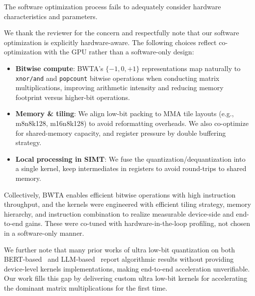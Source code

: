 \begin{revcomment}
The software optimization process fails to adequately consider hardware characteristics and parameters. 

\end{revcomment}
\begin{revresponse}[]

We thank the reviewer for the concern and respectfully note that our software optimization is explicitly hardware-aware. The following choices reflect co-optimization with the GPU rather than a software-only design: 
\begin{itemize}
    \item \textbf{Bitwise compute}: BWTA's $\{-1,0,+1\}$ representations map naturally to \texttt{xnor/and} and \texttt{popcount} bitwise operations when conducting matrix multiplications, improving arithmetic intensity and reducing memory footprint versus higher-bit operations. 
    \item \textbf{Memory \& tiling}: We align low-bit packing to MMA tile layouts (e.g., m8n8k128, m16n8k128) to avoid reformatting overheads. We also co-optimize for shared-memory capacity, and register pressure by double buffering strategy. 
    \item \textbf{Local processing in SIMT}: We fuse the quantization/dequantization into a single kernel, keep intermediates in registers to avoid round-trips to shared memory. 
\end{itemize}
Collectively, BWTA enables efficient bitwise operations with high instruction throughput, and the kernels were engineered with efficient tiling strategy, memory hierarchy, and instruction combination to realize measurable device-side and end-to-end gains. These were co-tuned with hardware-in-the-loop profiling, not chosen in a software-only manner. 

We further note that many prior works of ultra low-bit quantization on both BERT-based~\cite{bebert,liu2022bit,mlbert,qin2022bibert} and LLM-based~\cite{shang2023pbllm,chen2024dbllm,huang2024billm} report algorithmic results without providing device-level kernels implementations, making end-to-end acceleration unverifiable. Our work fills this gap by delivering custom ultra low-bit kernels for accelerating the dominant matrix multiplications for the first time. 

\end{revresponse}


